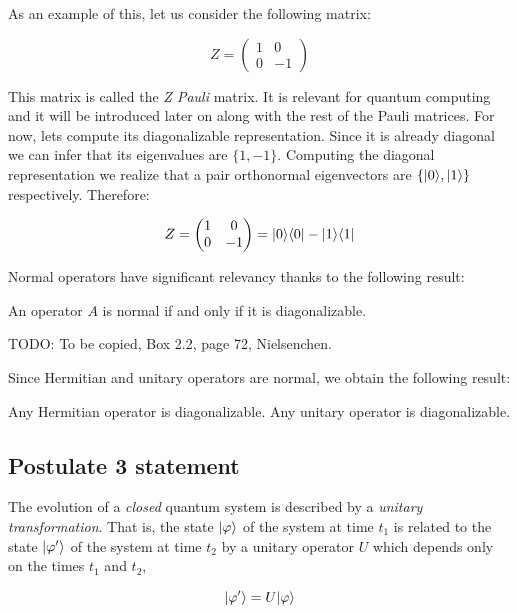 \begin{exampleth}
	As an example of this, let us consider the following matrix:
	
	$$ Z = 
	\begin{pmatrix}
		1 & 0 \\
		0 & -1 
	\end{pmatrix}
	$$
	
	This matrix is called the \emph{Z Pauli} matrix. It is relevant for quantum computing and it will be introduced later on along with the rest of the Pauli matrices. For now, lets compute its diagonalizable representation. Since it is already diagonal we can infer that its eigenvalues are $\{1, -1\}$. Computing the diagonal representation we realize that a pair orthonormal eigenvectors are $\{|0\rangle, |1\rangle\}$ respectively. Therefore:
	
	$$ Z = 
	\begin{pmatrix}
		1 & 0 \\
		0 & -1 
	\end{pmatrix} = 
	|0\rangle\langle0| - |1\rangle\langle1|
	$$
\end{exampleth}

Normal operators have significant relevancy thanks to the following result:

\begin{theorem}
	An operator $A$ is normal if and only if it is diagonalizable.
\end{theorem}
\begin{proofs}
	TODO: To be copied, Box 2.2, page 72, Nielsenchen.
\end{proofs}

Since Hermitian and unitary operators are normal, we obtain the following result:

\begin{corollary}
	Any Hermitian operator is diagonalizable. Any unitary operator is diagonalizable.
\end{corollary}


\subsection{Postulate 3 statement}

\begin{postulate}
	The evolution of a \emph{closed} quantum system is described by a \emph{unitary transformation}. That is, the state $|\varphi\rangle$ of the system at time $t_1$ is related to the state $|\varphi'\rangle$ of the system at time $t_2$ by a unitary operator $U$ which depends only on the times $t_1$ and $t_2$,
	
	$$ |\varphi'\rangle = U|\varphi\rangle $$
\end{postulate}

